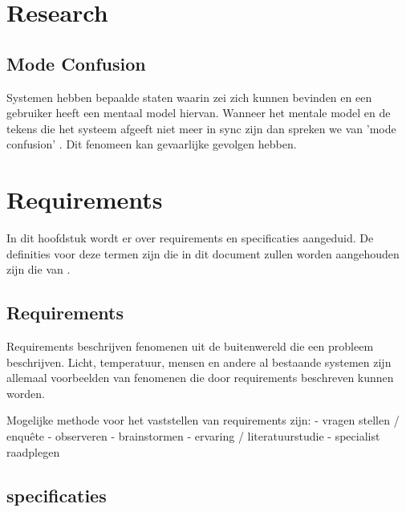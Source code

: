 \documentclass{article}
\begin{document}
\section{Research}

\subsection{Mode Confusion}
Systemen hebben bepaalde staten waarin zei zich kunnen bevinden en een gebruiker heeft een mentaal model hiervan. Wanneer het mentale model en de tekens die het systeem afgeeft niet meer in sync zijn dan spreken we van 'mode confusion' \cite{bredereke2002rigorous}. Dit fenomeen kan gevaarlijke gevolgen hebben.

\section{Requirements}

In dit hoofdstuk wordt er over requirements en specificaties aangeduid. De definities voor deze termen zijn die in dit document zullen worden aangehouden zijn die van \cite{thompson2000requirements}. \newline

\subsection{Requirements}

Requirements beschrijven fenomenen uit de buitenwereld die een probleem beschrijven. \newline \newline
Licht, temperatuur, mensen en andere al bestaande systemen zijn allemaal voorbeelden van fenomenen die door requirements beschreven kunnen worden. \newline

Mogelijke methode voor het vaststellen van requirements zijn: \newline
- vragen stellen / enquête \newline
- observeren \newline
- brainstormen \newline
- ervaring / literatuurstudie \newline
- specialist raadplegen \newline


\subsection{specificaties}
\end{document}
